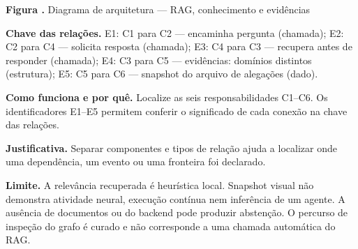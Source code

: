 {\small\textbf{Figura \thefigure.} Diagrama de arquitetura --- RAG, conhecimento e evidências}\par\smallskip
{\footnotesize\textbf{Chave das relações.} E1: C1 para C2 --- encaminha pergunta (chamada); E2: C2 para C4 --- solicita resposta (chamada); E3: C4 para C3 --- recupera antes de responder (chamada); E4: C3 para C5 --- evidências: domínios distintos (estrutura); E5: C5 para C6 --- snapshot do arquivo de alegações (dado).}\par\smallskip
\noindent\textbf{Como funciona e por quê.} Localize as seis responsabilidades C1--C6. Os identificadores E1--E5 permitem conferir o significado de cada conexão na chave das relações.\par
\noindent\textbf{Justificativa.} Separar componentes e tipos de relação ajuda a localizar onde uma dependência, um evento ou uma fronteira foi declarado.\par
\noindent\textbf{Limite.} A relevância recuperada é heurística local. Snapshot visual não demonstra atividade neural, execução contínua nem inferência de um agente. A ausência de documentos ou do backend pode produzir abstenção. O percurso de inspeção do grafo é curado e não corresponde a uma chamada automática do RAG.\par\smallskip
{}
